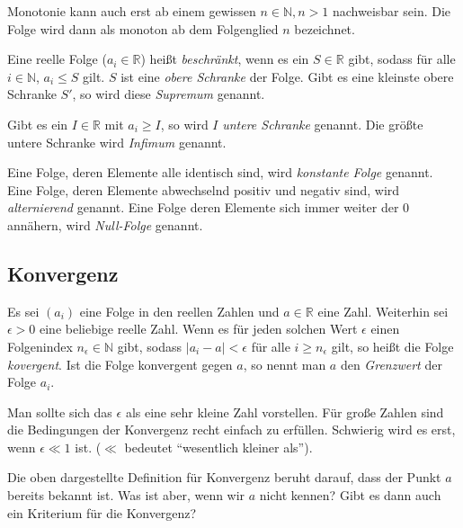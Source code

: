 Monotonie kann auch erst ab einem gewissen $n\in \mathbb{N}, n>1$ nachweisbar sein. Die Folge wird dann als monoton ab dem Folgenglied $n$ bezeichnet.

\begin{definition}
Eine reelle Folge ($a_i \in \mathbb{R}$) heißt \emph{beschränkt}, wenn es ein $S\in \mathbb{R}$ gibt, sodass für alle $i\in \mathbb{N}$, $a_i \le S$ gilt. $S$ ist eine \emph{obere Schranke} der Folge. Gibt es eine kleinste obere Schranke $S'$, so wird diese \emph{Supremum} genannt. 

Gibt es ein $I\in \mathbb{R}$ mit $a_i \ge I$, so wird $I$ \emph{untere Schranke} genannt. Die größte untere Schranke wird \emph{Infimum} genannt.
\end{definition}

\begin{definition}
Eine Folge, deren Elemente alle identisch sind, wird \emph{konstante Folge} genannt. Eine Folge, deren Elemente abwechselnd positiv und negativ sind, wird \emph{alternierend} genannt. Eine Folge deren Elemente sich immer weiter der 0 annähern, wird \emph{Null-Folge} genannt.
\end{definition}

\subsection{Konvergenz}

\begin{definition}\label{def:lim}
Es sei $(a_i)$ eine Folge in den reellen Zahlen und $a\in \mathbb{R}$ eine Zahl. Weiterhin sei $\epsilon>0$ eine beliebige reelle Zahl. Wenn es für jeden solchen Wert $\epsilon$ einen Folgenindex $n_\epsilon \in \mathbb{N}$ gibt, sodass $\vert a_i -a\vert <\epsilon$ für alle $i\ge n_\epsilon$ gilt, so heißt die Folge \emph{kovergent}. Ist die Folge konvergent gegen $a$, so nennt man $a$ den \emph{Grenzwert} der Folge $a_i$.
\end{definition}

Man sollte sich das $\epsilon$ als eine sehr kleine Zahl vorstellen. Für große Zahlen sind die Bedingungen der Konvergenz recht einfach zu erfüllen. Schwierig wird es erst, wenn $\epsilon\ll 1$ ist. ($\ll$ bedeutet "`wesentlich kleiner als"').

Die oben dargestellte Definition für Konvergenz beruht darauf, dass der Punkt $a$ bereits bekannt ist. Was ist aber, wenn wir $a$ nicht kennen? Gibt es dann auch ein Kriterium für die Konvergenz?

